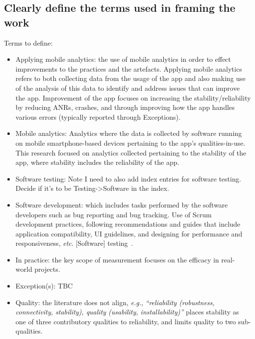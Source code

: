 \subsection{Clearly define the terms used in framing the work}
Terms to define:  
\begin{itemize}
    \item Applying mobile analytics: the use of mobile analytics in order to effect improvements to the practices and the artefacts. Applying mobile analytics refers to both collecting data from the usage of the app and also making use of the analysis of this data to identify and address issues that can improve the app. Improvement of the app focuses on increasing the stability/reliability by reducing ANRs, crashes, and through improving how the app handles various errors (typically reported through Exceptions).
    \item Mobile analytics: Analytics where the data is collected by software running on mobile smartphone-based devices pertaining to the app's qualities-in-use. This research focused on analytics collected pertaining to the stability of the app, where stability includes the reliability of the app.
    \item Software testing: Note I need to also add index entries for software testing. Decide if it's to be Testing->Software in the index.
    \item Software development: which includes tasks performed by the software developers such as bug reporting and bug tracking.  Use of Scrum development practices, following recommendations and guides that include application compatibility, UI guidelines, and designing for performance and responsiveness, \emph{etc}. [Software] testing~.~
    \item In practice: the key scope of measurement focuses on the efficacy in real-world projects.
    \item Exception(s): TBC
    \item Quality: the literature does not align, \emph{e.g.}, \emph{``reliability (robustness, connectivity, stability), quality (usability, installability)''}\cite[p.399]{wasserman2010_software_engineering_issues_for_mobile_app_devt} places stability as one of three contributory qualities to reliability, and limits quality to two sub-qualities.         
\end{itemize}

